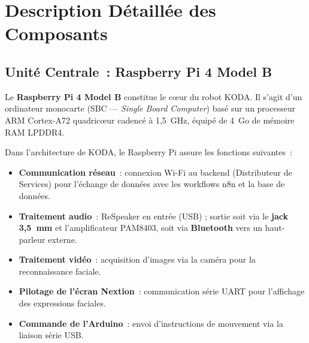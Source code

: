 \documentclass[a4paper,12pt]{report}
\begin{document}
	\section{Description Détaillée des Composants}
	
	\subsection{Unité Centrale~: Raspberry Pi 4 Model B}
	
	Le \textbf{Raspberry Pi 4 Model B} constitue le cœur du robot KODA. Il s'agit
	d'un ordinateur monocarte (SBC — \textit{Single Board Computer}) basé sur un
	processeur ARM Cortex-A72 quadricœur cadencé à 1{,}5~GHz, équipé de 4~Go
	de mémoire RAM LPDDR4.
	
	Dans l'architecture de KODA, le Raspberry Pi assure les fonctions suivantes~:
	\begin{itemize}
		\item \textbf{Communication réseau}~: connexion Wi-Fi au backend (Distributeur
		de Services) pour l'échange de données avec les workflows n8n et la base
		de données.
		\item \textbf{Traitement audio}~: ReSpeaker en entrée (USB) ; sortie soit
		via le \textbf{jack 3{,}5~mm} et l'amplificateur PAM8403, soit via
		\textbf{Bluetooth} vers un haut-parleur externe.
		\item \textbf{Traitement vidéo}~: acquisition d'images via la caméra pour
		la reconnaissance faciale.
		\item \textbf{Pilotage de l'écran Nextion}~: communication série UART pour
		l'affichage des expressions faciales.
		\item \textbf{Commande de l'Arduino}~: envoi d'instructions de mouvement via
		la liaison série USB.
	\end{itemize}
	
\end{document}
